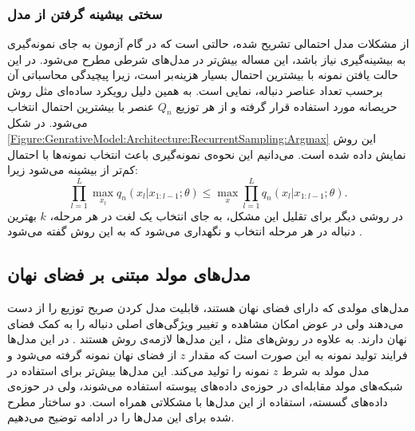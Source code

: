  \subsubsection{سختی بیشینه گرفتن از مدل}
 از مشکلات مدل احتمالی تشریح شده، حالتی است که در گام آزمون به جای نمونه‌گیری به بیشینه‌گیری نیاز باشد، این مساله بیش‌تر در مدل‌های شرطی مطرح می‌شود.
 در این حالت یافتن نمونه با بیشترین احتمال بسیار هزینه‌بر است، زیرا پیچیدگی محاسباتی آن بر‌حسب تعداد عناصر دنباله، نمایی است.
 به همین دلیل رویکرد ساده‌ای مثل روش حریصانه مورد استفاده قرار گرفته و از  هر توزیع‌ $Q_n$ عنصر با بیشترین احتمال انتخاب می‌شود. در شکل
 \ref{Figure:GenrativeModel:Architecture:RecurrentSampling:Argmax}
 این روش نمایش داده شده است.
 می‌دانیم این نحوه‌ی نمونه‌گیری باعث انتخاب نمونه‌ها با احتمال کم‌تر از بیشینه می‌شود زیرا:
 \begin{equation}
 \prod_{l=1}^{L} \max_{\substack{x_l}} q_n(x_l | x_{1:l-1};\theta)
 \leq
 \max_{\substack{x}} \prod_{l=1}^{L} q_n(x_l | x_{1:l-1};\theta).
 \end{equation}
در روشی دیگر برای تقلیل این مشکل، به جای انتخاب یک لغت در هر مرحله، $k$ بهترین دنباله در هر مرحله انتخاب و نگهداری می‌شود که به این روش 
 گفته می‌شود
 \cite{bengio2015scheduled}  .
 
 \subsection{مدل‌های مولد مبتنی بر فضای نهان}
  \label{Model:Generative:Latent}
مدل‌های مولدی که دارای فضای نهان هستند، قابلیت مدل کردن صریح توزیع را از دست می‌دهند ولی در عوض امکان مشاهده و تغییر ویژگی‌های اصلی دنباله را به کمک فضای نهان دارند. به علاوه در روش‌های مثل 
،
 این مدل‌ها لازمه‌ی روش هستند
 \cite{Doersch16VAETut}.
\newline
در این مدل‌ها فرایند تولید نمونه به این صورت است که مقدار $z$ از فضای نهان نمونه گرفته می‌شود و مدل مولد به شرط $z$ نمونه را تولید می‌کند. این مدل‌ها بیش‌تر برای استفاده در شبکه‌های مولد مقابله‌ای در حوزه‌ی داده‌های پیوسته استفاده می‌شوند، ولی در حوزه‌ی داده‌های گسسته، استفاده از این مدل‌ها با مشکلاتی همراه است.
\newline
دو ساختار مطرح شده برای این مدل‌ها را در ادامه توضیح می‌دهیم.
